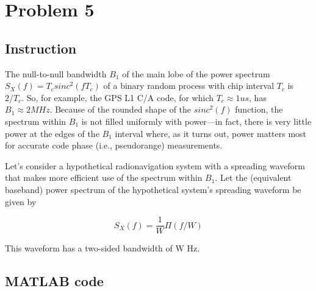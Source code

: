 \section{Problem 5}

\subsection{Instruction}

The null-to-null bandwidth $B_1$ of the main lobe of the power spectrum
$S_X(f) = T_c sinc^2 (f T_c)$ of a binary random process with chip interval
$T_c$ is $2/T_c$. So, for example, the GPS L1 C/A code, for which
$T_c \approx 1 us$, has $B_1 \approx 2 MHz$. Because of the rounded shape of the
$sinc^2 (f)$ function, the spectrum within $B_1$ is not filled uniformly with
power—in fact, there is very little power at the edges of the $B_1$ interval
where, as it turns out, power matters most for accurate code phase
(i.e., pseudorange) measurements.

Let’s consider a hypothetical radionavigation system with a spreading waveform
that makes more efficient use of the spectrum within $B_1$. Let the (equivalent
baseband) power spectrum of the hypothetical system’s spreading waveform be given
by

\begin{equation}
	S_X(f) = \frac{1}{W} \Pi (f/W)
\end{equation}

This waveform has a two-sided bandwidth of W Hz.


\subsection{MATLAB code}

